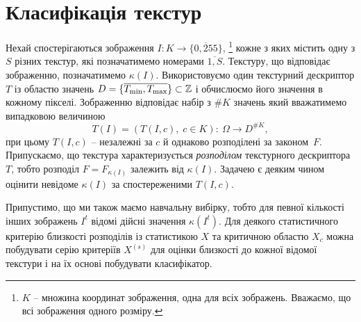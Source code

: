
\section{Класифікація текстур}\label{section1.3}

Нехай спостерігаються зображення $I \colon K \to \{\overline{0,255}\}$, 
\footnote{$K$ -- множина координат зображення, одна для всіх зображень. Вважаємо, що всі зображення одного розміру.}
кожне з яких містить одну з $S$ різних текстур, які позначатимемо номерами $\overline{1,S}$.
Текстуру, що відповідає зображенню, позначатимемо $\kappa(I)$.
Використовуємо один текстурний дескриптор $T$ із областю значень $D = \{\overline{T_{\min}, T_{\max}}\} \subset \mathbb Z$ і обчислюємо його значення в кожному пікселі. 
Зображенню відповідає набір з $\# K$ значень який вважатимемо випадковою величиною
\[ T(I) = \left(T(I,c),\; c\in K\right) \colon\ \Omega \to D^{\# K}, \]
при цьому $T(I,c)$ -- незалежні за $c$ й однаково розподілені за законом~$F$.
Припускаємо, що текстура характеризується \emph{розподілом} текстурного дескриптора $T$, тобто розподіл $F = F_{\kappa(I)}$ залежить від $\kappa(I)$.
Задачею є деяким чином оцінити невідоме $\kappa(I)$ за спостереженими $T(I,c)$.


Припустимо, що ми також маємо навчальну вибірку, тобто для певної кількості інших зображень $I^t$ відомі дійсні значення $\kappa(I^t)$. 
Для деякого статистичного критерію близкості розподілів із статистикою $X$ та критичною областю $X_c$ можна побудувати серію критеріїв $X^{(s)}$ 
для оцінки близкості до кожної відомої текстури і на їх основі побудувати класифікатор.

